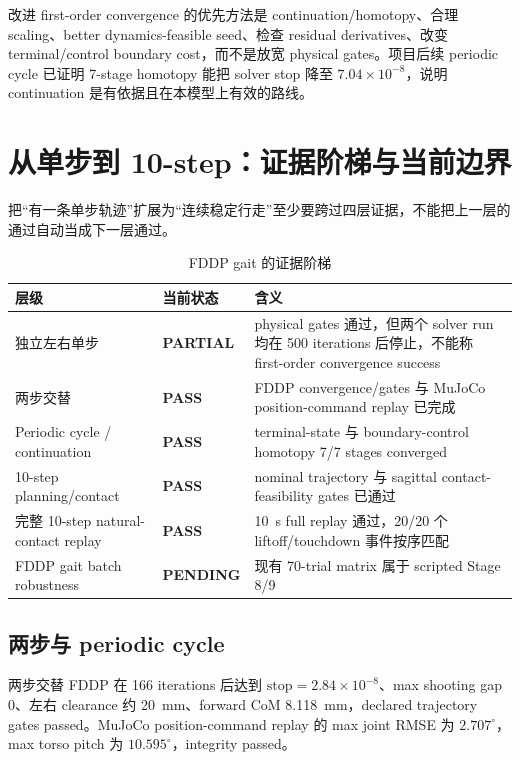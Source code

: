 \documentclass[UTF8,11pt,a4paper]{ctexart}
\newcommand{\pass}{\textcolor{green!45!black}{\textbf{PASS}}}
\newcommand{\partialstatus}{\textcolor{orange!75!black}{\textbf{PARTIAL}}}
\newcommand{\pending}{\textcolor{blue!60!black}{\textbf{PENDING}}}
\begin{document}
改进 first-order convergence 的优先方法是 continuation/homotopy、合理 scaling、better dynamics-feasible seed、检查 residual derivatives、改变 terminal/control boundary cost，而不是放宽 physical gates。项目后续 periodic cycle 已证明 7-stage homotopy 能把 solver stop 降至 $7.04\times10^{-8}$，说明 continuation 是有依据且在本模型上有效的路线。

\section{从单步到 10-step：证据阶梯与当前边界}\label{sec:multistep}

把“有一条单步轨迹”扩展为“连续稳定行走”至少要跨过四层证据，不能把上一层的通过自动当成下一层通过。

\begin{table}[htbp]
\centering
\caption{FDDP gait 的证据阶梯}
\begin{tabularx}{\linewidth}{@{}p{2.8cm}p{2.2cm}X@{}}
\toprule
层级 & 当前状态 & 含义 \\
\midrule
独立左右单步 & \partialstatus & physical gates 通过，但两个 solver run 均在 500 iterations 后停止，不能称 first-order convergence success \\
两步交替 & \pass & FDDP convergence/gates 与 MuJoCo position-command replay 已完成 \\
Periodic cycle / continuation & \pass & terminal-state 与 boundary-control homotopy 7/7 stages converged \\
10-step planning/contact & \pass & nominal trajectory 与 sagittal contact-feasibility gates 已通过 \\
完整 10-step natural-contact replay & \pass & \SI{10}{s} full replay 通过，20/20 个 liftoff/touchdown 事件按序匹配 \\
FDDP gait batch robustness & \pending & 现有 70-trial matrix 属于 scripted Stage 8/9 \\
\bottomrule
\end{tabularx}
\end{table}

\subsection{两步与 periodic cycle}

两步交替 FDDP 在 166 iterations 后达到 $\mathrm{stop}=2.84\times10^{-8}$、max shooting gap 0、左右 clearance 约 \SI{20}{mm}、forward CoM \SI{8.118}{mm}，declared trajectory gates passed。MuJoCo position-command replay 的 max joint RMSE 为 $2.707^\circ$，max torso pitch 为 $10.595^\circ$，integrity passed。
\end{document}

